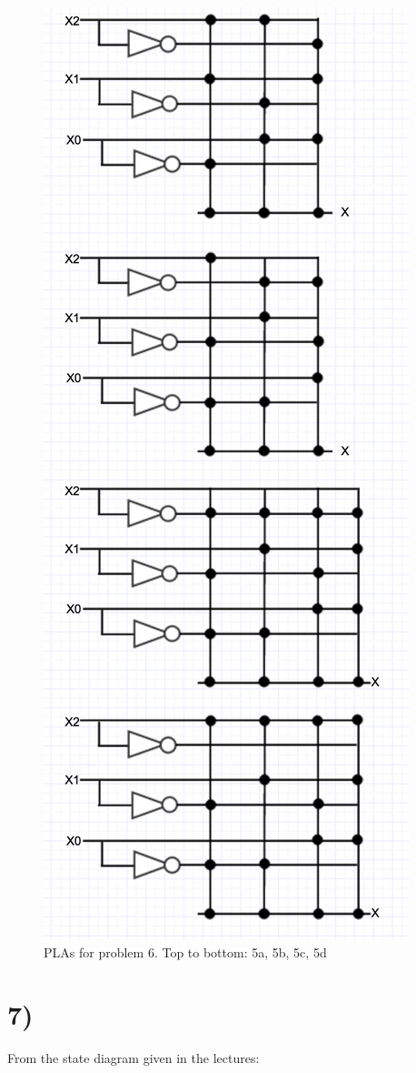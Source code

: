 \documentclass[a4paper,11pt]{article}
\begin{document}
\begin{figure}[h!]
\caption{PLAs for problem 6.  Top to bottom: 5a, 5b, 5c, 5d}
\centering
\includegraphics[width=.7\textwidth]{hw4_p6.png}
\end{figure}



\section*{7)}
From the state diagram given in the lectures:\\
\end{document}
